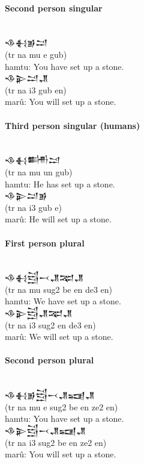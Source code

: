 \documentclass[a4paper,12pt]{book}
\newcommand{\fcm}{\large\setmainfont{Akkadian.otf}}
\begin{document}
\paragraph{Second person singular}\verb||\\
{\fcm 𒈾𒈬𒂊𒁺}\\
(tr na mu e gub)\\
hamtu: You have set up a stone.\\

\noindent
{\fcm 𒈾𒉌𒁺𒂗}\\
(tr na i3 gub en)\\
marû: You will set up a stone.

\newpage
\paragraph{Third person singular (humans)}\verb||\\
{\fcm 𒈾𒈬𒌦𒁺}\\
(tr na mu un gub)\\
hamtu: He has set up a stone.\\

\noindent
{\fcm 𒈾𒉌𒁺𒂊}\\
(tr na i3 gub e)\\
marû: He will set up a stone.

\paragraph{First person plural}\verb||\\
{\fcm 𒈾𒈬𒁻𒁁𒂗𒉈𒂗}\\
(tr na mu sug2 be en de3 en)\\
hamtu: We have set up a stone.\\

\noindent
{\fcm 𒈾𒉌𒁻𒂗𒉈𒂗}\\
(tr na i3 sug2 en de3 en)\\
marû: We will set up a stone.


\paragraph{Second person plural}\verb||\\
{\fcm 𒈾𒈬𒂊𒁻𒁁𒂗𒍢𒂗}\\
(tr na mu e sug2 be en ze2 en)\\
hamtu: You have set up a stone.\\

\noindent
{\fcm 𒈾𒉌𒁻𒁁𒂗𒍢𒂗}\\
(tr na i3 sug2 be en ze2 en)\\
marû: You will set up a stone.
\end{document}
